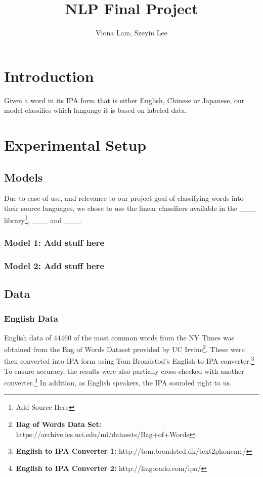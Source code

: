 \documentclass{paper}
\begin{document}
\title{NLP Final Project}
\author{Viona Lam, Szeyin Lee}
\maketitle
\section{Introduction}
Given a word in its IPA form that is either English, Chinese or Japanese, our model classifies which language it is based on labeled data.
\section{Experimental Setup}
\subsection{Models}
Due to ease of use, and relevance to our project goal of classifying words into their source languages, we chose to use the linear classifiers available in the \_\_\_ library\footnote{Add Source Here}, \_\_\_ and \_\_\_.
\subsubsection{Model 1: Add stuff here}
\subsubsection{Model 2: Add stuff here}
\subsection{Data}
\subsubsection{English Data}
English data of 44460 of the most common words from the NY Times was obtained from the Bag of Words Dataset provided by UC Irvine\footnote{\textbf{Bag of Words Data Set:} https://archive.ics.uci.edu/ml/datasets/Bag+of+Words}. These were then converted into IPA form using Tom Brondstod's English to IPA converter.\footnote{\textbf{English to IPA Converter 1:} http://tom.brondsted.dk/text2phoneme/} To ensure accuracy, the results were also partially cross-checked with another converter.\footnote{\textbf{English to IPA Converter 2: }http://lingorado.com/ipa/} In addition, as English speakers, the IPA sounded right to us.
\end{document}
